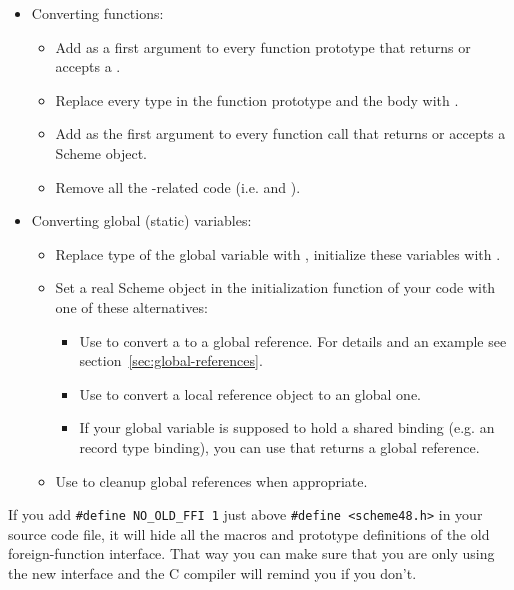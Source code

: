 \begin{itemize}
\item Converting functions:
  \begin{itemize}
  \item Add  as a first argument to every
    function prototype that returns or accepts a .

  \item Replace every  type in the function prototype
    and the body with .

  \item Add  as the first argument to every function call
    that returns or accepts a Scheme object.

  \item Remove all the -related code (i.e.
     and ).
  \end{itemize}

\item Converting global (static) variables:
  \begin{itemize}
  \item Replace  type of the global variable with
    , initialize these variables with .

  \item Set a real Scheme object in the initialization function of
    your code with one of these alternatives:
    \begin{itemize}
    \item Use  to convert a
       to a global reference.  For details and an
      example see section~\ref{sec:global-references}.

    \item Use  to convert a local
      reference object to an global one.

    \item If your global variable is supposed to hold a shared binding
      (e.g. an record type binding), you can use
       that returns a global
      reference.
    \end{itemize}
    
  \item Use  to cleanup global references
    when appropriate.
  \end{itemize}
\end{itemize}

\noindent{}If you add \verb|#define NO_OLD_FFI 1| just above
\verb|#define <scheme48.h>| in your source code file, it will hide all
the macros and prototype definitions of the old foreign-function
interface.  That way you can make sure that you are only using the new
interface and the C compiler will remind you if you don't.

